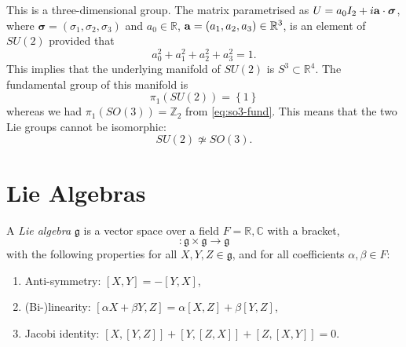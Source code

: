 \begin{example}[$G = SU(2)$]
  This is a three-dimensional group. The matrix parametrised as $U = a_0 I_2 + i \vb{a} \cdot \boldsymbol\sigma$, where $\boldsymbol\sigma = (\sigma_1, \sigma_2, \sigma_3)$ and $a_0 \in \mathbb{R}$, $\vb{a} = (a_1, a_2, a_3) \in \mathbb{R}^3$, is an element of $SU(2)$ provided that 
  \begin{equation}
    a_0^2 + a_1^2 + a_2^2 + a_3^2 = 1.
  \end{equation}
  This implies that the underlying manifold of $SU(2)$ is $S^3 \subset \mathbb{R}^4$.
  The fundamental group of this manifold is
  \begin{equation}
    \pi_1(SU(2)) = \left\{ 1 \right\}
  \end{equation}
  whereas we had $\pi_1(SO(3)) = \mathbb{Z}_2$ from \eqref{eq:so3-fund}. This means that the two Lie groups cannot be isomorphic:
  \begin{equation}
    SU(2) \not\simeq SO(3).
  \end{equation}
\end{example}

\chapter{Lie Algebras}%
\label{cha:lie_algebras}

\begin{definition} \label{def:lie_algebra}
  A \emph{Lie algebra} $\mathfrak{g}$ is a vector space over a field $F = \mathbb{R}, \mathbb{C}$ with a bracket, 
  \begin{equation}
    [\bullet, \bullet]\colon \mathfrak{g} \times \mathfrak{g} \to \mathfrak{g}
  \end{equation}
  with the following properties for all $X, Y, Z \in \mathfrak{g}$, and for all coefficients $\alpha, \beta \in F$:
  \begin{enumerate}
    \item Anti-symmetry: $[X, Y] = -[Y, X]$,
    \item (Bi-)linearity: $[\alpha X + \beta Y, Z] = \alpha[X, Z] + \beta [Y, Z]$,
    \item Jacobi identity: $[X, [Y, Z] ] + [Y, [Z, X] ] + [Z, [X, Y] ] = 0$.
  \end{enumerate}
\end{definition}

